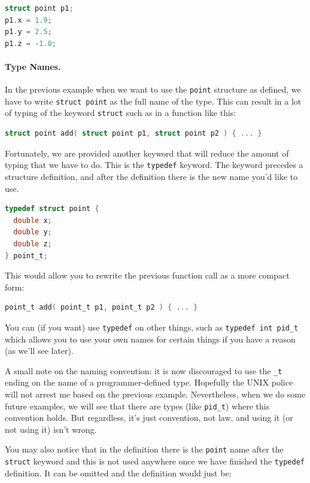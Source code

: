 \begin{lstlisting}[language=C]
struct point p1;
p1.x = 1.9;
p1.y = 2.5;
p1.z = -1.0;
\end{lstlisting}

\paragraph{Type Names.}
In the previous example when we want to use the \texttt{point} structure as defined, we have to write \texttt{struct point} as the full name of the type. This can result in a lot of typing of the keyword \texttt{struct} such as in a function like this:

\begin{lstlisting}[language=C]
struct point add( struct point p1, struct point p2 ) { ... }
\end{lstlisting}

Fortunately, we are provided another keyword that will reduce the amount of typing that we have to do. This is the \texttt{typedef} keyword. The keyword precedes a structure definition, and after the definition there is the new name you'd like to use.

\begin{lstlisting}[language=C]
typedef struct point {
  double x;
  double y;
  double z;
} point_t;
\end{lstlisting}

This would allow you to rewrite the previous function call as a more compact form:

\begin{lstlisting}[language=C]
point_t add( point_t p1, point_t p2 ) { ... }
\end{lstlisting}

You can (if you want) use \texttt{typedef} on other things, such as \texttt{typedef int pid\_t} which allows you to use your own names for certain things if you have a reason (as we'll see later).

A small note on the naming convention: it is now discouraged to use the \texttt{\_t} ending on the name of a programmer-defined type. Hopefully the UNIX police will not arrest me based on the previous example. Nevertheless, when we do some future examples, we will see that there are types (like \texttt{pid\_t}) where this convention holds. But regardless, it's just convention, not law, and using it (or not using it) isn't wrong.

You may also notice that in the definition there is the \texttt{point} name after the \texttt{struct} keyword and this is not used anywhere once we have finished the \texttt{typedef} definition. It can be omitted and the definition would just be:


